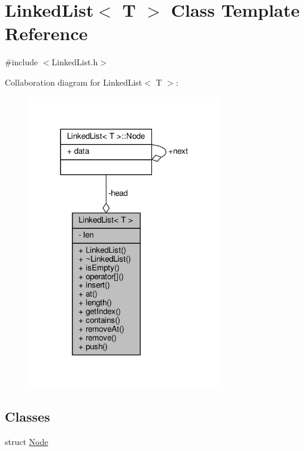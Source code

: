 \hypertarget{classLinkedList}{}\section{Linked\+List$<$ T $>$ Class Template Reference}
\label{classLinkedList}


{\ttfamily \#include $<$Linked\+List.\+h$>$}



Collaboration diagram for Linked\+List$<$ T $>$\+:
\nopagebreak
\begin{figure}[H]
\begin{center}
\leavevmode
\includegraphics[width=240pt]{classLinkedList__coll__graph}
\end{center}
\end{figure}
\subsection*{Classes}
\begin{DoxyCompactItemize}
\item 
struct \hyperlink{structLinkedList_1_1Node}{Node}
\end{DoxyCompactItemize}
